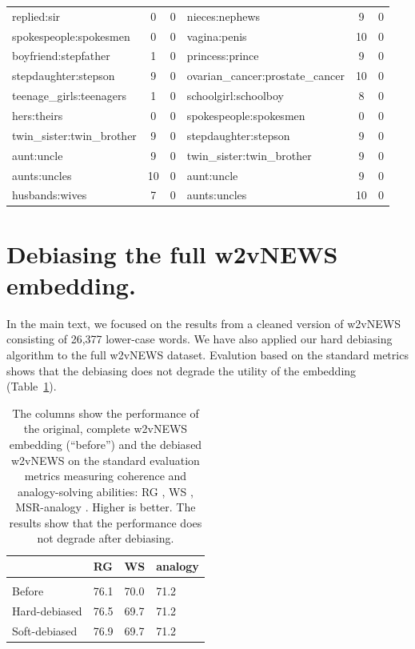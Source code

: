 \documentclass{article}
\begin{document}
\begin{longtable}{l|c|c|l|c|c}
replied:sir & 0 & 0 & nieces:nephews & 9 &0 \\
spokespeople:spokesmen & 0 & 0 & vagina:penis & 10 &0 \\
boyfriend:stepfather & 1 & 0 & princess:prince & 9 &0 \\
stepdaughter:stepson & 9 & 0 & ovarian\_cancer:prostate\_cancer & 10 &0 \\
teenage\_girls:teenagers & 1 & 0 & schoolgirl:schoolboy & 8 &0 \\
hers:theirs & 0 & 0 & spokespeople:spokesmen & 0 &0 \\
twin\_sister:twin\_brother & 9 & 0 & stepdaughter:stepson & 9 &0 \\
aunt:uncle & 9 & 0 & twin\_sister:twin\_brother & 9 &0 \\
aunts:uncles & 10 & 0 & aunt:uncle & 9 &0 \\
husbands:wives & 7 & 0 & aunts:uncles & 10 &0 \\
\end{longtable}

\section{Debiasing the full w2vNEWS embedding.}
In the main text, we focused on the results from a cleaned version of w2vNEWS consisting of 26,377 lower-case words. We have also applied our hard debiasing algorithm to the full w2vNEWS dataset. Evalution based on the standard metrics shows that the debiasing does not degrade the utility of the embedding (Table~\ref{tab:results_full}).  

\begin{table}
\begin{tabular}{l|lll}
  & RG & WS & analogy  \\
  \hline
  \hline\\
Before  &	76.1& 70.0 & 71.2 \\
Hard-debiased & 76.5	& 69.7 & 71.2\\
Soft-debiased & 76.9 & 69.7 & 71.2 \\
\end{tabular}
	\caption{The columns show the performance of the original, complete 
	w2vNEWS embedding (``before'') and the debiased w2vNEWS on the standard evaluation metrics measuring coherence and analogy-solving abilities: RG \cite{rubenstein1965contextual}, WS \cite{finkelstein2001placing}, MSR-analogy \cite{mikolov2013linguistic}. Higher is better. The results show that the performance does not degrade after debiasing. 
	\label{tab:results_full}}
\end{table}
\end{document}
